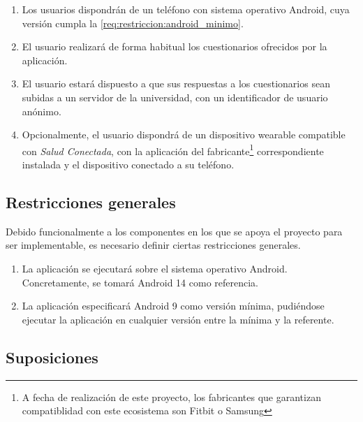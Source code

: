         \begin{enumerate}
            \item Los usuarios dispondrán de un teléfono con sistema operativo Android, cuya versión cumpla la \ref{req:restriccion:android_minimo}.
            \item El usuario realizará de forma habitual los cuestionarios ofrecidos por la aplicación.
            \item El usuario estará dispuesto a que sus respuestas a los cuestionarios sean subidas a un servidor de la universidad, con un identificador de usuario anónimo.
            \item Opcionalmente, el usuario dispondrá de un dispositivo \gls{wearable} compatible con \textit{Salud Conectada}, con la aplicación del fabricante\footnote{A fecha de realización de este proyecto, los fabricantes que garantizan compatiblidad con este ecosistema son Fitbit o Samsung} correspondiente instalada y el dispositivo conectado a su teléfono.
            
        \end{enumerate}
        
    \subsection{Restricciones generales}
        \label{req:descripcion:restricciones}
        Debido funcionalmente a los componentes en los que se apoya el proyecto para ser implementable, es necesario definir ciertas restricciones generales.
        \begin{enumerate}[label=\textbf{RG-\arabic*}]
            \item \label{req:restriccion:android_referencia} La aplicación se ejecutará sobre el sistema operativo Android. Concretamente, se tomará Android 14 como referencia.
            \item \label{req:restriccion:android_minimo} La aplicación especificará Android 9 como versión mínima, pudiéndose ejecutar la aplicación en cualquier versión entre la mínima y la referente.
        \end{enumerate}
    
    \subsection{Suposiciones}
        
